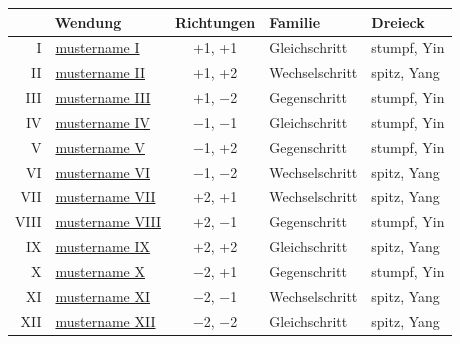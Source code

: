 \documentclass[12pt,paper=a5,DIV=13,headings=small,twoside=true,open=any]{scrbook}
\begin{document}
\begin{center}
\footnotesize\renewcommand{\arraystretch}{1.15}\setlength{\tabcolsep}{3pt}
\begin{tabular}{@{}rlcll@{}}
\toprule
\multicolumn{2}{c}{\textbf{Wendung}} & \textbf{Richtungen} & \textbf{Familie} & \textbf{Dreieck} \\
\midrule
I    & \hyperlink{muster:I}{\csname mustername I\endcsname} & +1, +1 & Gleichschritt & stumpf, Yin \\
II   & \hyperlink{muster:II}{\csname mustername II\endcsname} & +1, +2 & Wechselschritt & spitz, Yang \\
III  & \hyperlink{muster:III}{\csname mustername III\endcsname} & +1, −2 & Gegenschritt & stumpf, Yin \\
IV   & \hyperlink{muster:IV}{\csname mustername IV\endcsname} & −1, −1 & Gleichschritt & stumpf, Yin \\
V    & \hyperlink{muster:V}{\csname mustername V\endcsname} & −1, +2 & Gegenschritt & stumpf, Yin \\
VI   & \hyperlink{muster:VI}{\csname mustername VI\endcsname} & −1, −2 & Wechselschritt & spitz, Yang \\
VII  & \hyperlink{muster:VII}{\csname mustername VII\endcsname} & +2, +1 & Wechselschritt & spitz, Yang \\
VIII & \hyperlink{muster:VIII}{\csname mustername VIII\endcsname} & +2, −1 & Gegenschritt & stumpf, Yin \\
IX   & \hyperlink{muster:IX}{\csname mustername IX\endcsname} & +2, +2 & Gleichschritt & spitz, Yang \\
X    & \hyperlink{muster:X}{\csname mustername X\endcsname} & −2, +1 & Gegenschritt & stumpf, Yin \\
XI   & \hyperlink{muster:XI}{\csname mustername XI\endcsname} & −2, −1 & Wechselschritt & spitz, Yang \\
XII  & \hyperlink{muster:XII}{\csname mustername XII\endcsname} & −2, −2 & Gleichschritt & spitz, Yang \\
\bottomrule
\end{tabular}
\end{center}
\end{document}

